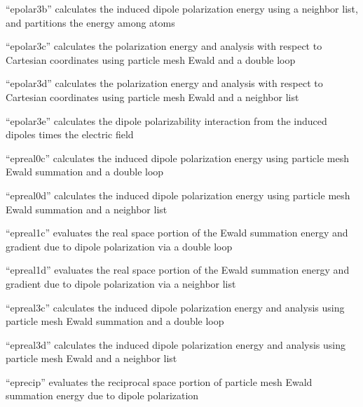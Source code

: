 \documentclass[letterpaper,11pt,english]{sphinxmanual}
\begin{document}

“epolar3b” calculates the induced dipole polarization energy
using a neighbor list, and partitions the energy among atoms


“epolar3c” calculates the polarization energy and analysis with
respect to Cartesian coordinates using particle mesh Ewald and
a double loop


“epolar3d” calculates the polarization energy and analysis with
respect to Cartesian coordinates using particle mesh Ewald and
a neighbor list


“epolar3e” calculates the dipole polarizability interaction
from the induced dipoles times the electric field


“epreal0c” calculates the induced dipole polarization energy
using particle mesh Ewald summation and a double loop


“epreal0d” calculates the induced dipole polarization energy
using particle mesh Ewald summation and a neighbor list


“epreal1c” evaluates the real space portion of the Ewald
summation energy and gradient due to dipole polarization
via a double loop


“epreal1d” evaluates the real space portion of the Ewald
summation energy and gradient due to dipole polarization
via a neighbor list


“epreal3c” calculates the induced dipole polarization energy and
analysis using particle mesh Ewald summation and a double loop


“epreal3d” calculates the induced dipole polarization energy
and analysis using particle mesh Ewald and a neighbor list


“eprecip” evaluates the reciprocal space portion of particle
mesh Ewald summation energy due to dipole polarization
\end{document}
